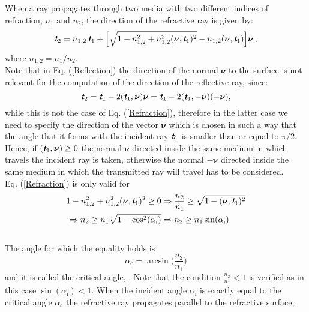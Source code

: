 When a ray propagates through two media with two different indices of refraction, $n_1$ and $n_2$, the direction of the refractive ray is given by:
\begin{equation}\label{Refraction}
\textit{\textbf{t}}_2 = n_{1,2}\,\textit{\textbf{t}}_1+
\Big[\sqrt{1-n_{1,2}^2+n_{1,2}^2(\boldsymbol{\nu},\textit{\textbf{t}}_1)^2}-n_{1,2}(\boldsymbol{\nu},\textit{\textbf{t}}_1) \Big]\boldsymbol{\nu}\,,
\end{equation}
where $n_{1,2}=n_1/n_2$. \\
 \indent Note that in Eq. (\ref{Reflection}) the direction of the normal $\boldsymbol{\nu}$ to the surface is not relevant for the computation of the direction of the reflective ray, since:
\begin{equation}
\textit{\textbf{t}}_2 = \textit{\textbf{t}}_1-2(\textit{\textbf{t}}_1,\boldsymbol{\nu})\boldsymbol{\nu}= \textit{\textbf{t}}_1-2(\textit{\textbf{t}}_1,-\boldsymbol{\nu})(-\boldsymbol{\nu}) ,
\end{equation}
while this is not the case of Eq. (\ref{Refraction}), therefore in the latter case we need to specify the direction of the vector $\boldsymbol{\nu}$ which is chosen in such a way that the angle that it forms with the incident ray $\textit{\textbf{t}}_1$ is smaller than or equal to $\pi/2$. Hence, if $(\textit{\textbf{t}}_1, \boldsymbol{\nu})\geq0$ the normal $\boldsymbol{\nu}$ directed inside the same medium in which travels the incident ray is taken, otherwise the normal $-\boldsymbol{\nu}$ directed inside the same medium in which the transmitted ray will travel has to be considered. \\ \indent
Eq. (\ref{Refraction}) is only valid for 
\begin{equation}\label{tir}\begin{split}
1-n_{1,2}^2+n_{1,2}^2(\boldsymbol{\nu},\textit{\textbf{t}}_1)^2\geq 0 & \Rightarrow \frac{n_2}{n_1}\geq \sqrt{1-(\boldsymbol{\nu},\textit{\textbf{t}}_1)^2}\\
\Rightarrow n_2\geq n_1\sqrt{1-\cos^2(\alpha_\textrm{i})} & \Rightarrow  n_2\geq n_1 \sin(\alpha_\textrm{i})
\end{split}
\end{equation}
\\ \indent
 The angle for which the equality holds is
\begin{equation}\label{critical}
\alpha_{\textrm{c}} = \arcsin\Big(\frac{n_2}{n_1}\Big)
\end{equation} and it is called the critical angle, \cite{chaves2015introduction}.
Note that the condition $\frac{n_2}{n_1}<1$ is verified as in this case $\sin(\alpha_\textrm{i})<1$.
When the incident angle $\alpha_{\textrm{i}}$ is exactly equal to the critical angle $\alpha_{\textrm{c}}$ the refractive ray propagates parallel to the refractive surface, 
